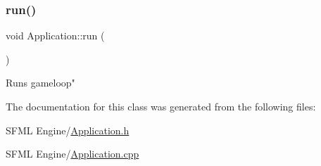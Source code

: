 \subsubsection{\texorpdfstring{run()}{run()}}
{\footnotesize\ttfamily void Application\+::run (\begin{DoxyParamCaption}{ }\end{DoxyParamCaption})}

Runs gameloop" 

The documentation for this class was generated from the following files\+:\begin{DoxyCompactItemize}
\item 
S\+F\+M\+L Engine/\hyperlink{_application_8h}{Application.\+h}\item 
S\+F\+M\+L Engine/\hyperlink{_application_8cpp}{Application.\+cpp}\end{DoxyCompactItemize}
